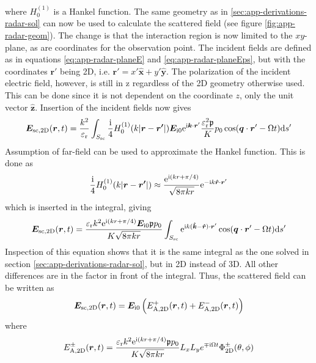 \documentclass[11pt,twoside]{eitExjobb}
\begin{document}
	where $H_0^{(1)}$ is a Hankel function. The same geometry as in \ref{sec:app-derivations-radar-sol} can now be used to calculate the scattered field (see figure \ref{fig:app-radar-geom}). The change is that the interaction region is now limited to the $xy$-plane, as are coordinates for the observation point. The incident fields are defined as in equations \eqref{eq:app-radar-planeE} and \eqref{eq:app-radar-planeEps}, but with the coordinates $\bm{r}'$ being 2D, i.e. $\bm{r}' = x'\bm{\hat{x}} + y'\bm{\hat{y}}$. The polarization of the incident electric field, however, is still in z regardless of the 2D geometry otherwise used. This can be done since it is not dependent on the coordinate $z$, only the unit vector $\bm{\hat{z}}$. Insertion of the incident fields now gives
	\begin{equation*}
		\bm{E}_{\mathrm{sc,2D}}(\bm{r},t) = \frac{k^2}{\varepsilon_{\mathrm{r}}} \int_{S_{\mathrm{sc}}} \frac{\mathrm{i}}{4} H_0^{(1)}( k |\bm{r}-\bm{r'}|) \bm{E}_{\mathrm{i}0} \mathrm{e}^{\mathrm{i} \bm{k} \cdot \bm{r}'} \frac{\varepsilon_{\mathrm{r}}^2 \mathfrak{p}}{K} p_0 \cos(\bm{q} \cdot \bm{r}' - \Omega t) \mathrm{d}s'
	\end{equation*}
	Assumption of far-field can be used to approximate the Hankel function. This is done as \addref {}
	\begin{equation*}
		\frac{\mathrm{i}}{4} H_0^{(1)}( k |\bm{r}-\bm{r'}|) \approx \frac{\mathrm{e}^{\mathrm{i} (kr + \pi/4)}}{\sqrt{8\pi kr}} \mathrm{e}^{-\mathrm{i} k \bm{\hat{r}} \cdot \bm{r}'}
	\end{equation*}
	which is inserted in the integral, giving
	\begin{equation*}
		\bm{E}_{\mathrm{sc,2D}}(\bm{r},t) = \frac{\varepsilon_{\mathrm{r}}k^2 \mathrm{e}^{\mathrm{i} (kr + \pi/4)} \bm{E}_{\mathrm{i}0} \mathfrak{p} p_0}{K \sqrt{8\pi kr}} \int_{S_{\mathrm{sc}}} \mathrm{e}^{\mathrm{i} k ( \bm{\hat{k}} - \bm{\hat{r}} ) \cdot \bm{r}'} \cos(\bm{q} \cdot \bm{r}' - \Omega t) \mathrm{d}s'
	\end{equation*}
	Inspection of this equation shows that it is the same integral as the one solved in section \ref{sec:app-derivations-radar-sol}, but in 2D instead of 3D. All other differences are in the factor in front of the integral. Thus, the scattered field can be written as
	\begin{equation*}
		\bm{E}_{\mathrm{sc,2D}} (\bm{r},t) = \bm{E}_{\mathrm{i}0} \left( E_{\mathrm{A,2D}}^+ (\bm{r},t) + E_{\mathrm{A,2D}}^- (\bm{r},t) \right)
	\end{equation*}
	where
	\begin{equation*}
		E_{\mathrm{A,2D}}^\pm (\bm{r},t) = \frac{\varepsilon_{\mathrm{r}}k^2 \mathrm{e}^{\mathrm{i} (kr + \pi/4)} \mathfrak{p} p_0}{K \sqrt{8\pi kr}} L_{x} L_{y} e^{\mp \mathrm{i} \Omega t} \Phi_{\mathrm{2D}}^\pm (\theta,\phi)
	\end{equation*}
\end{document}
